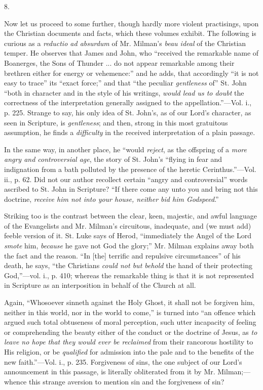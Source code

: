 8.

Now let us proceed to some further, though hardly
more violent practisings, upon the Christian documents and facts,
which these volumes exhibit. The following is curious as a \emph{reductio
ad absurdum} of Mr. Milman's \emph{beau ideal} of the Christian
temper. He observes that James and John, who ``received the remarkable
name of Boanerges, the Sons of Thunder ... do not appear remarkable
among their brethren either for energy or vehemence:'' and he adds,
that accordingly ``it is not easy to trace'' its ``exact force;'' and that
``the peculiar \emph{gentleness} of'' St. John ``both in character and in
the style of his writings, \emph{would lead us to doubt} the
correctness of the interpretation generally assigned to the
appellation.''—Vol. i., p. 225. Strange to say, his only idea of St.
John's, as of our Lord's character, as seen in Scripture, is \emph{gentleness};
and then, strong in this most gratuitous assumption, he finds a \emph{difficulty} in the received interpretation of a plain passage.

In the same way, in another place, he ``would \emph{reject},
as the offspring of a \emph{more angry and controversial age},
the story of St. John's ``flying in fear and indignation from a bath
polluted by the presence of the heretic Cerinthus.''—Vol. ii., p. 62.
Did not our author recollect certain ``angry and controversial'' words
ascribed to St. John in Scripture? ``If there come any unto you and
bring not this doctrine, \emph{receive him not into your house, neither
bid him Godspeed}.''

Striking too is the contrast between the clear,
keen, majestic, and awful language of the Evangelists and Mr. Milman's
circuitous, inadequate, and (we must add) feeble version of it. St.
Luke says of Herod, ``immediately the Angel of the Lord \emph{smote}
him, \emph{because} he gave not God the glory;'' Mr. Milman explains
away both the fact and the reason. ``In [the] terrific and repulsive
circumstances'' of his death, he says, ``the Christians \emph{could not but
behold} the hand of their protecting God,''—vol. i., p. 410;
whereas the remarkable thing is that it is not represented in
Scripture as an interposition in behalf of the Church at all.

Again, ``Whosoever sinneth against the Holy Ghost,
it shall not be forgiven him, neither in this world, nor in the world
to come,'' is turned into ``an offence which argued such total
obtuseness of moral perception, such utter incapacity of feeling or
comprehending the beauty either of the conduct or the doctrine of
Jesus, as \emph{to leave no hope that they would ever be reclaimed}
from their rancorous hostility to His religion, or be \emph{qualified}
for admission into the pale and to the benefits of the new faith.''—Vol.
i., p. 235. Forgiveness of sins, the one subject of our Lord's
announcement in this passage, is literally obliterated from it by Mr.
Milman;—whence this strange aversion to mention sin and the
forgiveness of sin?


